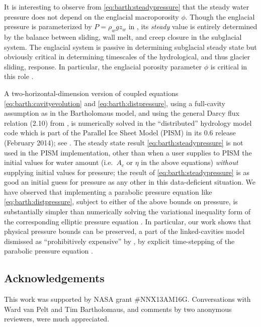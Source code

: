 \documentclass[twocolumn,letterpaper]{igs}
\begin{document}
It is interesting to observe from \eqref{eq:barth:steadypressure} that the steady water pressure does not depend on the englacial macroporosity $\phi$.  Though the englacial pressure is parameterized by $P=\rho_w g z_w$ in \cite{Bartholomausetal2011}, its \emph{steady} value is entirely determined by the balance between sliding, wall melt, and creep closure in the subglacial system.  The englacial system is passive in determining subglacial steady state but obviously critical in determining timescales of the hydrological, and thus glacier sliding, response.  In particular, the englacial porosity parameter $\phi$ is critical in this role \citep{vanPeltthesis}.

A two-horizontal-dimension version of coupled equations \eqref{eq:barth:cavityevolution} and \eqref{eq:barth:distpressure}, using a full-cavity assumption as in the Bartholomaus model, and using the general Darcy flux relation (2.10) from \cite{Schoofetal2012}, is numerically solved in the ``distributed'' hydrology model code which is part of the Parallel Ice Sheet Model (PISM) in its 0.6 release (February 2014); see \cite{BuelervanPeltDRAFT}.  The steady state result \eqref{eq:barth:steadypressure} is not used in the PISM implementation, other than when a user supplies to PISM the initial values for water amount (i.e.~$A_c$ or $\eta$ in the above equations) \emph{without} supplying initial values for pressure; the result of \eqref{eq:barth:steadypressure} is as good an initial guess for pressure as any other in this data-deficient situation.  We have observed that implementing a parabolic pressure equation like \eqref{eq:barth:distpressure}, subject to either of the above bounds on pressure, is substantially simpler than numerically solving the variational inequality form of the corresponding elliptic pressure equation \citep{Schoofetal2012}.  In particular, our work shows that physical pressure bounds can be preserved, a part of the linked-cavities model dismissed as ``prohibitively expensive'' by \cite{Werderetal2013}, by explicit time-stepping of the parabolic pressure equation \citep{BuelervanPeltDRAFT}.


\subsection*{Acknowledgements}  This work was supported by NASA grant \#NNX13AM16G.  Conversations with Ward van Pelt and Tim Bartholomaus, and comments by two anonymous reviewers, were much appreciated.



\end{document}
